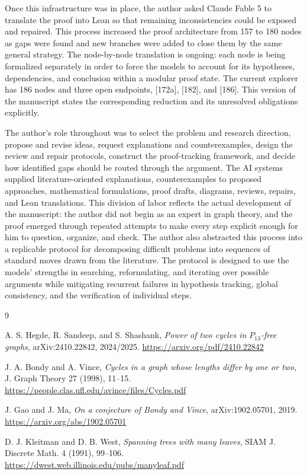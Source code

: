 \documentclass[11pt]{article}
\begin{document}
Once this infrastructure was in place, the author asked Claude Fable 5 to
translate the proof into Lean so that remaining inconsistencies could be
exposed and repaired.  This process increased the proof architecture from 157
to 180 nodes as gaps were found and new branches were added to close them by
the same general strategy.  The node-by-node translation is ongoing: each node
is being formalized separately in order to force the models to account for its
hypotheses, dependencies, and conclusion within a modular proof state.
The current explorer has 186 nodes and three open endpoints, [172a], [182],
and [186].  This version of the manuscript states the corresponding
reduction and its unresolved obligations explicitly.

The author's role throughout was to select the problem and research direction,
propose and revise ideas, request explanations and counterexamples, design the
review and repair protocols, construct the proof-tracking framework, and decide
how identified gaps should be routed through the argument.  The AI systems
supplied literature-oriented explanations, counterexamples to proposed
approaches, mathematical formulations, proof drafts, diagrams, reviews,
repairs, and Lean translations.  This division of labor reflects the actual
development of the manuscript: the author did not begin as an expert in graph
theory, and the proof emerged through repeated attempts to make every step
explicit enough for him to question, organize, and check.  The author also
abstracted this process into a replicable protocol for decomposing difficult
problems into sequences of standard moves drawn from the literature.  The
protocol is designed to use the models' strengths in searching, reformulating,
and iterating over possible arguments while mitigating recurrent failures in
hypothesis tracking, global consistency, and the verification of individual
steps.

\begin{thebibliography}{9}

A. S. Hegde, R. Sandeep, and S. Shashank,
\emph{Power of two cycles in $P_{13}$-free graphs},
arXiv:2410.22842, 2024/2025.
\url{https://arxiv.org/pdf/2410.22842}

J. A. Bondy and A. Vince,
\emph{Cycles in a graph whose lengths differ by one or two},
J. Graph Theory 27 (1998), 11--15.
\url{https://people.clas.ufl.edu/avince/files/Cycles.pdf}

J. Gao and J. Ma,
\emph{On a conjecture of Bondy and Vince},
arXiv:1902.05701, 2019.
\url{https://arxiv.org/abs/1902.05701}

D. J. Kleitman and D. B. West,
\emph{Spanning trees with many leaves},
SIAM J. Discrete Math. 4 (1991), 99--106.
\url{https://dwest.web.illinois.edu/pubs/manyleaf.pdf}

\end{thebibliography}
\end{document}
